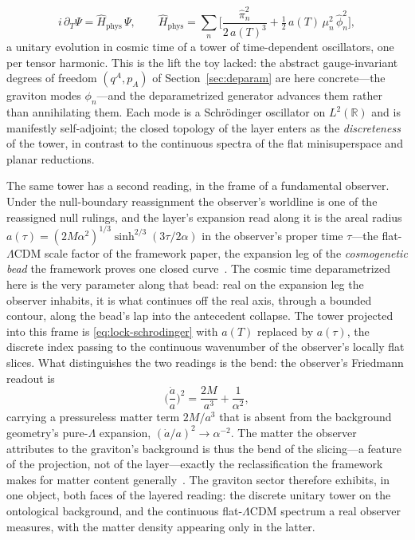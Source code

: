 \documentclass[11pt,a4paper]{article}
\theoremstyle{plain}
\theoremstyle{definition}
\theoremstyle{remark}
\newcommand{\Hphys}{H_{\mathrm{phys}}}
\begin{document}
\begin{equation}
i\,\partial_T\Psi=\hat\Hphys\,\Psi,\qquad
\hat\Hphys=\sum_n\Big[\frac{\hat\pi_n^2}{2\,a(T)^3}+\tfrac12\, a(T)\,\mu_n^2\,\hat\phi_n^2\Big],
\label{eq:lock-schrodinger}
\end{equation}
a unitary evolution in cosmic time of a tower of time-dependent oscillators, one per tensor harmonic. This is the lift the toy lacked: the abstract gauge-invariant degrees of freedom $(q^A,p_A)$ of Section~\ref{sec:deparam} are here concrete---the graviton modes $\phi_n$---and the deparametrized generator advances them rather than annihilating them. Each mode is a Schr\"odinger oscillator on $L^2(\mathbb{R})$ and is manifestly self-adjoint; the closed topology of the layer enters as the \emph{discreteness} of the tower, in contrast to the continuous spectra of the flat minisuperspace and planar reductions.

The same tower has a second reading, in the frame of a fundamental observer. Under the null-boundary reassignment the observer's worldline is one of the reassigned null rulings, and the layer's expansion read along it is the areal radius $a(\tau)=(2M\alpha^2)^{1/3}\sinh^{2/3}(3\tau/2\alpha)$ in the observer's proper time $\tau$---the flat-$\Lambda$CDM scale factor of the framework paper, the expansion leg of the \emph{cosmogenetic bead} the framework proves one closed curve~\cite{JanzenCRframework}. The cosmic time deparametrized here is the very parameter along that bead: real on the expansion leg the observer inhabits, it is what continues off the real axis, through a bounded contour, along the bead's lap into the antecedent collapse. The tower projected into this frame is \eqref{eq:lock-schrodinger} with $a(T)$ replaced by $a(\tau)$, the discrete index passing to the continuous wavenumber of the observer's locally flat slices. What distinguishes the two readings is the bend: the observer's Friedmann readout is
\begin{equation}
\Big(\frac{\dot a}{a}\Big)^2=\frac{2M}{a^3}+\frac{1}{\alpha^2},
\label{eq:obs-friedmann}
\end{equation}
carrying a pressureless matter term $2M/a^3$ that is absent from the background geometry's pure-$\Lambda$ expansion, $(\dot a/a)^2\!\to\!\alpha^{-2}$. The matter the observer attributes to the graviton's background is thus the bend of the slicing---a feature of the projection, not of the layer---exactly the reclassification the framework makes for matter content generally~\cite{JanzenCRframework,JanzenOperator}. The graviton sector therefore exhibits, in one object, both faces of the layered reading: the discrete unitary tower on the ontological background, and the continuous flat-$\Lambda$CDM spectrum a real observer measures, with the matter density appearing only in the latter.
\end{document}

